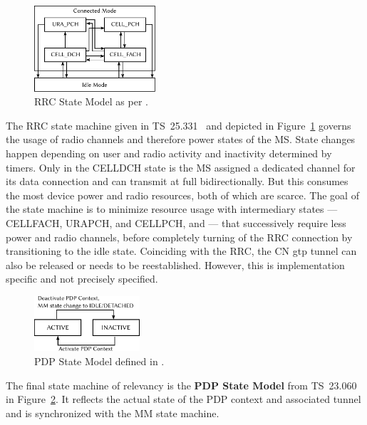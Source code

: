 \begin{figure}[htb] 
	\centering
	\includegraphics[width=0.4\textwidth]{images/rrc-state-model.pdf}
	\caption{\acrshort{RRC} State Model as per \cite[Section~7.1]{3gpp.25.331}.}
	\label{c4:fig:rrcstatemodel}
\end{figure}

 The \gls{RRC} state machine given in \gls{TS}~25.331~\cite[Section~7.1]{3gpp.25.331} and depicted in Figure~\ref{c4:fig:rrcstatemodel} governs the usage of radio channels and therefore power states of the \gls{MS}. State changes happen depending on user and radio activity and inactivity determined by timers. Only in the \gls{CELLDCH} state is the \gls{MS} assigned a dedicated channel for its data connection and can transmit at full bidirectionally. But this consumes the most device power and radio resources, both of which are scarce. The goal of the state machine is to minimize resource usage with intermediary states --- \gls{CELLFACH}, \gls{URAPCH}, and \gls{CELLPCH}, and  --- that successively require less power and radio channels, before completely turning of the \gls{RRC} connection by transitioning to the idle state. Coinciding with the \gls{RRC}, the \gls{CN} \gls{gtp} tunnel can also be released or needs to be reestablished. However, this is implementation specific and not precisely specified.

\begin{figure}[htb]
	\centering
	\includegraphics[width=0.35\textwidth]{images/pdp-state-model.pdf}
	\caption{\acrshort{PDP} State Model defined in \cite[Section~9]{3gpp.23.060}.}
\label{c4:fig:pdpstatemodel}
\end{figure}

The final state machine of relevancy is the \textbf{\gls{PDP} State Model} from \gls{TS}~23.060~\cite[Section~9]{3gpp.23.060} in Figure~\ref{c4:fig:pdpstatemodel}. It reflects the actual state of the \gls{PDP} context and associated tunnel and is synchronized with the \gls{MM} state machine.


